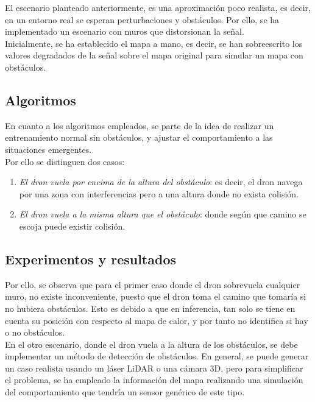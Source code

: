El escenario planteado anteriormente, es una aproximación poco realista, es decir, en un entorno real se esperan perturbaciones y obstáculos. Por ello, se ha implementado un escenario con muros que distorsionan la señal.\\

Inicialmente, se ha establecido el mapa a mano, es decir, se han sobreescrito los valores degradados de la señal sobre el mapa original para simular un mapa con obstáculos.\\

\subsection{Algoritmos}
\label{subsec:algoritmo_sfo}

En cuanto a los algoritmos empleados, se parte de la idea de realizar un entrenamiento normal sin obstáculos, y ajustar el comportamiento a las situaciones emergentes.\\

Por ello se distinguen dos casos:

\begin{enumerate}
    \item \emph{El dron vuela por encima de la altura del obstáculo}: es decir, el dron navega por una zona con interferencias pero a una altura donde no exista colisión.

    \item \emph{El dron vuela a la misma altura que el obstáculo}: donde según que camino se escoja puede existir colisión.
\end{enumerate}

\subsection{Experimentos y resultados}
\label{subsec:experimentos_sfo}

Por ello, se observa que para el primer caso donde el dron sobrevuela cualquier muro, no existe inconveniente, puesto que el dron toma el camino que tomaría si no hubiera obstáculos. Esto es debido a que en inferencia, tan solo se tiene en cuenta su posición con respecto al mapa de calor, y por tanto no identifica si hay o no obstáculos.\\

En el otro escenario, donde el dron vuela a la altura de los obstáculos, se debe implementar un método de detección de obstáculos. En general, se puede generar un caso realista usando un láser LiDAR o una cámara 3D, pero para simplificar el problema, se ha empleado la información del mapa realizando una simulación del comportamiento que tendría un sensor genérico de este tipo.\\

